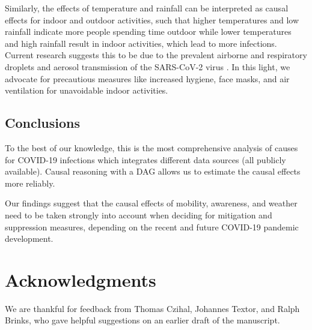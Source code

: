 \documentclass[]{elsarticle} %
\begin{document}
Similarly, the effects of temperature and rainfall can be interpreted as
causal effects for indoor and outdoor activities, such that higher
temperatures and low rainfall indicate more people spending time outdoor
while lower temperatures and high rainfall result in indoor activities,
which lead to more infections. Current research suggests this to be due
to the prevalent airborne and respiratory droplets and aerosol
transmission of the SARS-CoV-2 virus \citep{world2020transmission}. In
this light, we advocate for precautious measures like increased hygiene,
face masks, and air ventilation for unavoidable indoor activities.

\subsection{Conclusions}\label{conclusions}

To the best of our knowledge, this is the most comprehensive analysis of
causes for COVID-19 infections which integrates different data sources
(all publicly available). Causal reasoning with a DAG allows us to
estimate the causal effects more reliably.

Our findings suggest that the causal effects of mobility, awareness, and
weather need to be taken strongly into account when deciding for
mitigation and suppression measures, depending on the recent and future
COVID-19 pandemic development.

\section*{Acknowledgments}\label{acknowledgments}

We are thankful for feedback from Thomas Czihal, Johannes Textor, and
Ralph Brinks, who gave helpful suggestions on an earlier draft of the
manuscript.

\renewcommand\refname{References}

\end{document}
